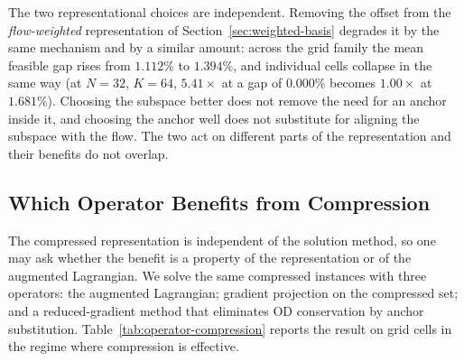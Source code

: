 \documentclass[11pt]{article}
\newif\ifshownotes \shownotesfalse
\newcommand{\conote}[1]{\ifshownotes{\color{red}\small\textsf{[Note to co-authors: #1]}}\fi}
\begin{document}
The two representational choices are independent. Removing the offset from the
\emph{flow-weighted} representation of Section~\ref{sec:weighted-basis} degrades it by the same
mechanism and by a similar amount: across the grid family the mean feasible gap rises from
$1.112\%$ to $1.394\%$, and individual cells collapse in the same way (at $N=32$, $K=64$,
$5.41\times$ at a gap of $0.000\%$ becomes $1.00\times$ at $1.681\%$). Choosing the subspace
better does not remove the need for an anchor inside it, and choosing the anchor well does not
substitute for aligning the subspace with the flow. The two act on different parts of the
representation and their benefits do not overlap.

\conote{This result cuts both ways and we should decide how to present it. It explains why the
representation works, but it also quantifies the dependence Referee~1 objected to: $w_0$ is
obtained by solving the full problem, and we have now proved the method needs it. The
strongest available answer is an experiment we have not run --- reuse a \emph{stale} $w_0$
from a perturbed instance and show the speedup survives. That single test would answer the
circularity objection, the preprocessing objection and the ``which application setting''
objection at once. Recommend we run it before resubmission.}


\subsection{Which Operator Benefits from Compression}
\label{sec:operator-study}


The compressed representation is independent of the solution method, so one may ask whether
the benefit is a property of the representation or of the augmented Lagrangian. We solve the
same compressed instances with three operators: the augmented Lagrangian; gradient projection
on the compressed set; and a reduced-gradient method that eliminates OD conservation by
anchor substitution. Table~\ref{tab:operator-compression} reports the result on grid cells in
the regime where compression is effective.
\end{document}
